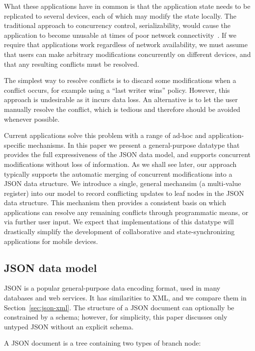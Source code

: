\documentclass[10pt,journal,compsoc]{IEEEtran}
\begin{document}
What these applications have in common is that the application state needs to be replicated to several devices, each of which may modify the state locally. The traditional approach to concurrency control, serializability, would cause the application to become unusable at times of poor network connectivity~\cite{Davidson:1985hv}. If we require that applications work regardless of network availability, we must assume that users can make arbitrary modifications concurrently on different devices, and that any resulting conflicts must be resolved.

The simplest way to resolve conflicts is to discard some modifications when a conflict occurs, for example using a ``last writer wins'' policy. However, this approach is undesirable as it incurs data loss. An alternative is to let the user manually resolve the conflict, which is tedious and therefore should be avoided whenever possible.

Current applications solve this problem with a range of ad-hoc and application-specific mechanisms. In this paper we present a general-purpose datatype that provides the full expressiveness of the JSON data model, and supports concurrent modifications without loss of information. As we shall see later, our approach typically supports the automatic merging of concurrent modifications into a JSON data structure. We introduce a single, general mechansim (a multi-value register) into our model to record conflicting updates to leaf nodes in the JSON data structure. This mechanism then provides a consistent basis on which applications can resolve any remaining conflicts through programmatic means, or via further user input.  We expect that implementations of this datatype will drastically simplify the development of collaborative and state-synchronizing applications for mobile devices.

\subsection{JSON data model}

JSON is a popular general-purpose data encoding format, used in many databases and web services. It has similarities to XML, and we compare them in Section~\ref{sec:json-xml}. The structure of a JSON document can optionally be constrained by a schema; however, for simplicity, this paper discusses only untyped JSON without an explicit schema.

A JSON document is a tree containing two types of branch node:
\end{document}
